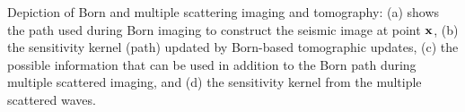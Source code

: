 %
{Depiction of Born and multiple scattering imaging and tomography: (a) shows the path used during Born imaging to construct
the seismic image at point ${\bf x}$, (b) the sensitivity kernel (path) updated by Born-based tomographic updates,
(c) the possible information that can be used in addition to the Born path during  multiple scattered imaging, and (d) 
the sensitivity kernel from the multiple scattered waves.}


%
%
%
%


